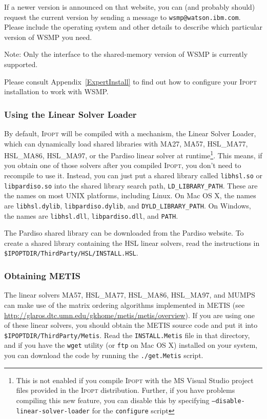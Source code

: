 \documentclass[10pt]{article}
\newcommand{\Ipopt}{\textsc{Ipopt}\xspace}
\begin{document}
If a newer version is announced on that website, you can (and
probably should) request the current version by sending a message to
\verb|wsmp@watson.ibm.com|.  Please include the operating system and
other details to describe which particular version of WSMP you need.


Note: Only the interface to the shared-memory version of WSMP is
currently supported.

Please consult Appendix~\ref{ExpertInstall} to find out how to
configure your \Ipopt installation to work with WSMP.

\subsubsection{Using the Linear Solver  Loader}\label{sec:linear_solver_loader}
By default, \Ipopt will be compiled with a mechanism, the Linear
Solver Loader, which can dynamically load shared libraries with MA27,
MA57, HSL\_MA77, HSL\_MA86, HSL\_MA97, or the Pardiso linear solver at runtime\footnote{This is not
  enabled if you compile \Ipopt with the MS Visual Studio project files
  provided in the \Ipopt distribution.  Further, if you have problems
  compiling this new feature, you can disable this by specifying
  \texttt{--disable-linear-solver-loader} for the \texttt{configure}
  script}. This means, if you obtain one of those solvers after you
compiled \Ipopt, you don't need to recompile to
use it.  Instead, you can just put a shared library called
\texttt{libhsl.so} or \texttt{libpardiso.so} into the shared library
search path, \texttt{LD\_LIBRARY\_PATH}.  These are the names on most
UNIX platforms, including Linux.  On Mac OS X, the names are
\texttt{libhsl.dylib}, \texttt{libpardiso.dylib}, and
\texttt{DYLD\_LIBRARY\_PATH}.  On Windows, the names are \texttt{libhsl.dll},
\texttt{libpardiso.dll}, and \texttt{PATH}.

The Pardiso shared library can be downloaded from the Pardiso website.
To create a shared library containing the HSL linear solvers, read the
instructions in \texttt{\$IPOPTDIR/ThirdParty/HSL/INSTALL.HSL}.

\subsubsection{Obtaining METIS}\label{sec:METIS}

The linear solvers MA57, HSL\_MA77, HSL\_MA86, HSL\_MA97, and MUMPS can make use of the matrix
ordering algorithms implemented in METIS (see
\url{http://glaros.dtc.umn.edu/gkhome/metis/metis/overview}).  If
you are using one of these linear solvers, you should obtain the METIS
source code and put it into \texttt{\$IPOPTDIR/ThirdParty/Metis}.
Read the \texttt{INSTALL.Metis} file in that directory, and if you
have the \texttt{wget} utility (or \texttt{ftp} on Mac OS X) installed on your system, you can
download the code by running the \texttt{./get.Metis} script.
\end{document}
